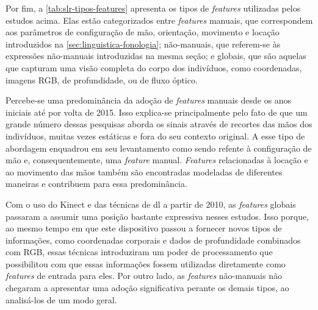 




Por fim, a \autoref{tab:slr-tipos-features} apresenta os tipos de \textit{features} utilizadas pelos estudos acima. Elas estão categorizados entre \textit{features} manuais, que correspondem aos parâmetros de configuração de mão, orientação, movimento e locação introduzidos na \autoref{sec:linguistica-fonologia}; não-manuais, que referem-se às expressões não-manuais introduzidas na mesma seção; e globais, que são aquelas que capturam uma visão completa do corpo dos indivíduos, como coordenadas, imagens RGB, de profundidade, ou de fluxo óptico.


Percebe-se uma predominância da adoção de \textit{features} manuais desde os anos iniciais até por volta de 2015. Isso explica-se principalmente pelo fato de que um grande número dessas pesquisas aborda os sinais através de recortes das mãos dos indivíduos, muitas vezes estáticas e fora do seu contexto original. A esse tipo de abordagem  enquadrou em seu levantamento como sendo refente à configuração de mão e, consequentemente, uma \textit{feature} manual. \textit{Features} relacionadas à locação e ao movimento das mãos também são encontradas modeladas de diferentes maneiras e contribuem para essa predominância.



Com o uso do Kinect e das técnicas de \acrlong{dl} a partir de 2010, as \textit{features} globais passaram a assumir uma posição bastante expressiva nesses estudos. Isso porque, ao mesmo tempo em que este dispositivo passou a fornecer novos tipos de informações, como coordenadas corporais e dados de profundidade combinados com RGB, essas técnicas introduziram um poder de processamento que possibilitou com que essas informações fossem utilizadas diretamente como \textit{features} de entrada para eles.
Por outro lado, as \textit{features} não-manuais não chegaram a apresentar uma adoção significativa perante os demais tipos, ao analisá-los de um modo geral.



